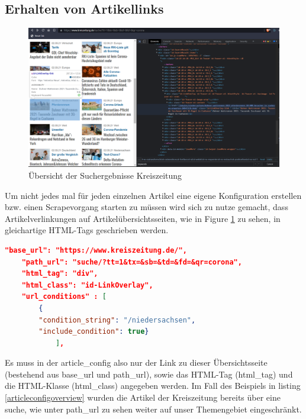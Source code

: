 \documentclass[12pt,oneside,a4paper,parskip]{scrbook}
\begin{document}
\subsection{Erhalten von Artikellinks}
\begin{figure}[h]
\caption{Übersicht der Suchergebnisse Kreiszeitung}
\label{articlelist}
\centering
\includegraphics[scale=0.4]{articles_list.png}
\end{figure}

Um nicht jedes mal für jeden einzelnen Artikel eine eigene Konfiguration erstellen bzw. einen Scrapevorgang starten zu müssen wird sich zu nutze gemacht, dass Artikelverlinkungen auf Artikelübersichtsseiten, wie in Figure \ref {articlelist} zu sehen, in gleichartige HTML-Tags geschrieben werden.

\begin{lstlisting}[caption=article\_config für Übersichtsseite,label=articleconfigoverview,language=json]
    "base_url": "https://www.kreiszeitung.de/",
    "path_url": "suche/?tt=1&tx=&sb=&td=&fd=&qr=corona",
    "html_tag": "div",
    "html_class": "id-LinkOverlay",
    "url_conditions" : [
        {
        "condition_string": "/niedersachsen",
        "include_condition": true}
        	],
\end{lstlisting}

Es muss in der article\_config also nur der Link zu dieser Übersichtsseite (bestehend aus base\_url und path\_url), sowie das HTML-Tag (html\_tag) und die HTML-Klasse (html\_class) angegeben werden. Im Fall des Beispiels in listing \ref{articleconfigoverview} wurden die Artikel der Kreiszeitung bereits über eine suche, wie unter path\_url zu sehen weiter auf unser Themengebiet eingeschränkt.
\pagebreak
\end{document}
